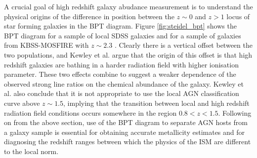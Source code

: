 \documentclass{literature}
\begin{document}
A crucial goal of high redshift galaxy abudance measurement is to understand the physical origins of the difference in position between the $z \sim 0$ and $z > 1$ locus of star forming galaxies in the BPT diagram. Figure \ref{fig:steidel_bpt} shows the BPT diagram for a sample of local SDSS galaxies \citep{Tremonti2004} and for a sample of galaxies from KBSS-MOSFIRE with $z \sim 2.3$ \citep{Steidel2014}. Clearly there is a vertical offset between the two populations, and Kewley et al. \citep{Kewley2013} argue that the origin of this offset is that high redshift galaxies are bathing in a harder radiation field with higher ionisation parameter. These two effects combine to suggest a weaker dependence of the observed strong line ratios on the chemical abundance of the galaxy. Kewley et al. also conclude that it is not appropriate to use the local AGN classification curve above $z \sim 1.5$, implying that the transition between local and high redshift radiation field conditions occurs somewhere in the region $0.8 < z < 1.5$. Following on from the above section, use of the BPT diagram to separate AGN hosts from a galaxy sample is essential for obtaining accurate metallicity estimates and for diagnosing the redshift ranges between which the physics of the ISM are different to the local norm.    
\end{document}
